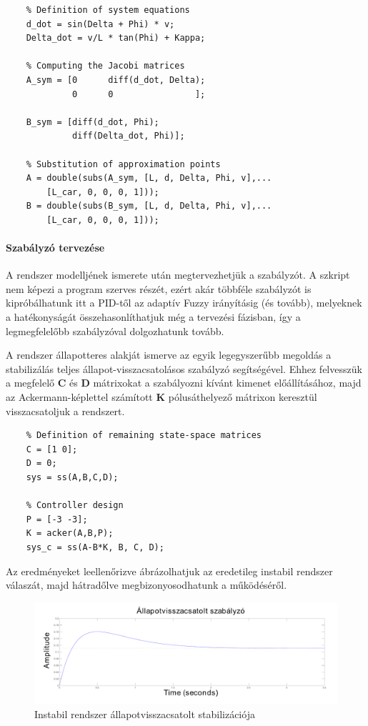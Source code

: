 \begin{lstlisting}
    % Definition of system equations
    d_dot = sin(Delta + Phi) * v;
    Delta_dot = v/L * tan(Phi) + Kappa;
    
    % Computing the Jacobi matrices
    A_sym = [0      diff(d_dot, Delta);
             0      0                ];
       
    B_sym = [diff(d_dot, Phi);
             diff(Delta_dot, Phi)];
    
    % Substitution of approximation points
    A = double(subs(A_sym, [L, d, Delta, Phi, v],...
        [L_car, 0, 0, 0, 1]));
    B = double(subs(B_sym, [L, d, Delta, Phi, v],...
        [L_car, 0, 0, 0, 1]));
\end{lstlisting}

\paragraph{Szabályzó tervezése}

A rendszer modelljének ismerete után megtervezhetjük a szabályzót. A szkript nem képezi a program szerves részét, ezért akár többféle szabályzót is kipróbálhatunk itt a PID-től az adaptív Fuzzy irányításig (és tovább), melyeknek a hatékonyságát összehasonlíthatjuk még a tervezési fázisban, így a legmegfelelőbb szabályzóval dolgozhatunk tovább.

A rendszer állapotteres alakját ismerve az egyik legegyszerűbb megoldás a stabilizálás teljes állapot-visszacsatolásos szabályzó segítségével. Ehhez felvesszük a megfelelő \textbf{C} és \textbf{D} mátrixokat a szabályozni kívánt kimenet előállításához, majd az Ackermann-képlettel számított \textbf{K} pólusáthelyező mátrixon keresztül visszacsatoljuk a rendszert.

\begin{lstlisting}
    % Definition of remaining state-space matrices
    C = [1 0];
    D = 0;
    sys = ss(A,B,C,D);
    
    % Controller design
    P = [-3 -3];
    K = acker(A,B,P);
    sys_c = ss(A-B*K, B, C, D);
\end{lstlisting}

Az eredményeket leellenőrizve ábrázolhatjuk az eredetileg instabil rendszer válaszát, majd hátradőlve megbizonyosodhatunk a működéséről.

\begin{figure}[!ht]
    \centering
    \includegraphics[width=\linewidth]{img/plot2}
    \caption{Instabil rendszer állapotvisszacsatolt stabilizációja}
    \label{fig:plot2}
\end{figure}

